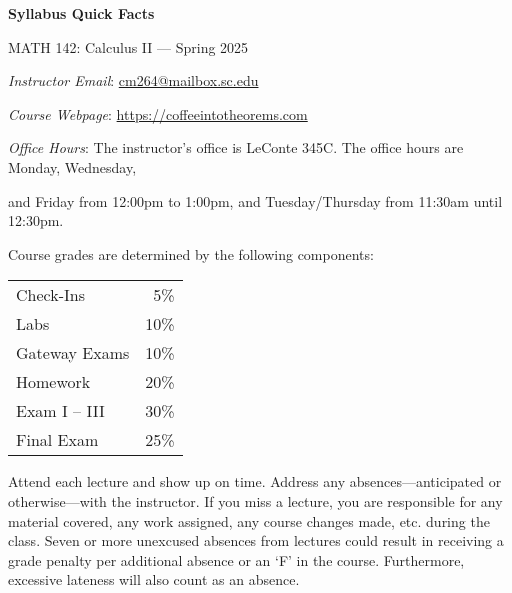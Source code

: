 \documentclass[11pt,letterpaper]{article}
\begin{document}
\begin{center} 
\bfseries
\color{scred}
\LARGE Syllabus Quick Facts \par\vspace{0.2\baselineskip}
\Large MATH 142: Calculus II --- Spring 2025
\end{center} \pspace


\hspace{0.53cm} {\itshape Instructor Email}: \href{mailto:cm264@mailbox.sc.edu}{cm264@mailbox.sc.edu} \par
\hspace{0.53cm} {\itshape Course Webpage}: \href{https://coffeeintotheorems.com}{https://coffeeintotheorems.com} \par
\hspace{0.53cm} {\itshape Office Hours}: The instructor's office is LeConte 345C. The office hours are Monday, Wednesday, \par \hspace{0.55cm} and Friday from 12:00pm to 1:00pm, and Tuesday/Thursday from 11:30am until 12:30pm. \pspace


Course grades are determined by the following components: \par \vspace{-0.3cm}
	\begin{table}[!ht]
        \begin{tabular}{lr}
	Check-Ins & 5\% \\
	Labs & 10\% \\
	Gateway Exams& 10\% \\
	Homework & 20\% \\
	Exam I -- III & 30\% \\
	Final Exam & 25\%
        \end{tabular} 
        \end{table}


Attend each lecture and show up on time. Address any absences---anticipated or otherwise---with the instructor. If you miss a lecture, you are responsible for any material covered, any work assigned, any course changes made, etc. during the class. Seven or more unexcused absences from lectures could result in receiving a grade penalty per additional absence or an `F' in the course. Furthermore, excessive lateness will also count as an absence. 
\pspace
\end{document}
